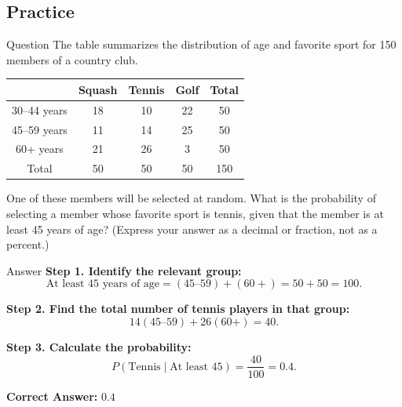 \documentclass{beamer}
\begin{document}
\begin{frame}
\section{Practice}
\end{frame}


\begin{frame}{Question}
The table summarizes the distribution of age and favorite sport for 150 members of a country club.

\begin{center}
\begin{tabular}{|c|c|c|c|c|}
\hline
 & Squash & Tennis & Golf & Total \\
\hline
30–44 years & 18 & 10 & 22 & 50 \\
45–59 years & 11 & 14 & 25 & 50 \\
60+ years & 21 & 26 & 3 & 50 \\
\hline
Total & 50 & 50 & 50 & 150 \\
\hline
\end{tabular}
\end{center}

One of these members will be selected at random. What is the probability of selecting a member whose favorite sport is tennis, given that the member is at least 45 years of age? (Express your answer as a decimal or fraction, not as a percent.)
\end{frame}
\begin{frame}{Answer}
\textbf{Step 1. Identify the relevant group:}
\[
\text{At least 45 years of age} = (45–59) + (60+) = 50 + 50 = 100.
\]

\textbf{Step 2. Find the total number of tennis players in that group:}
\[
14 (\text{45–59}) + 26 (\text{60+}) = 40.
\]

\textbf{Step 3. Calculate the probability:}
\[
P(\text{Tennis} \mid \text{At least 45}) = \frac{40}{100} = 0.4.
\]

\textbf{Correct Answer:} $\boxed{0.4}$
\end{frame}
\end{document}
